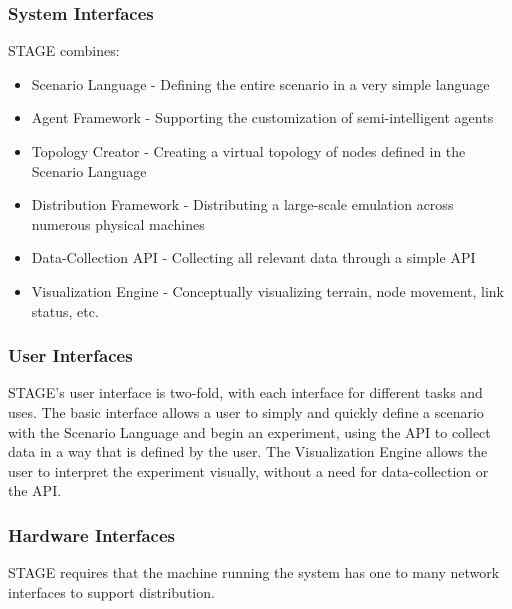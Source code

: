 \documentclass[titlepage]{article}
\begin{document}

\subsubsection{System Interfaces%
  \label{system-interfaces}%
}

STAGE combines:
\begin{itemize}
    \item Scenario Language - Defining the entire scenario in a very simple language
    \item Agent Framework - Supporting the customization of semi-intelligent agents
    \item Topology Creator - Creating a virtual topology of nodes defined in the Scenario Language
    \item Distribution Framework - Distributing a large-scale emulation across numerous physical machines
    \item Data-Collection API - Collecting all relevant data through a simple API
    \item Visualization Engine - Conceptually visualizing terrain, node movement, link status, etc.
\end{itemize}


\subsubsection{User Interfaces%
  \label{user-interfaces}%
}

STAGE's user interface is two-fold, with each interface for different tasks and uses. The basic interface allows a user to simply and quickly define a scenario with the Scenario Language and begin an experiment, using the API to collect data in a way that is defined by the user. The Visualization Engine allows the user to interpret the experiment visually, without a need for data-collection or the API.


\subsubsection{Hardware Interfaces%
  \label{hardware-interfaces}%
}

STAGE requires that the machine running the system has one to many network interfaces to support distribution.
\end{document}
